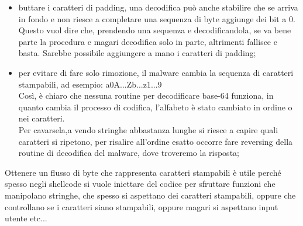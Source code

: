 \documentclass[12pt, oneside]{extbook}
\begin{document}
\begin{itemize}
	\item buttare i caratteri di padding, una decodifica può anche stabilire che se arriva in fondo e non riesce a completare una sequenza di byte aggiunge dei bit a 0. Questo vuol dire che, prendendo una sequenza e decodificandola, se va bene parte la procedura e magari decodifica solo in parte, altrimenti fallisce e basta. Sarebbe possibile aggiungere a mano i caratteri di padding;
	\item per evitare di fare solo rimozione, il malware cambia la sequenza di caratteri stampabili, ad esempio: a0A...Zb...z1...9\;\\Così, è chiaro che nessuna routine per decodificare base-64 funziona, in quanto cambia il processo di codifica, l'alfabeto è stato cambiato in ordine o nei caratteri.\\Per cavarsela,a vendo stringhe abbastanza lunghe si riesce a capire quali caratteri si ripetono, per risalire all'ordine esatto occorre fare reversing della routine di decodifica del malware, dove troveremo la risposta;
\end{itemize}
Ottenere un flusso di byte che rappresenta caratteri stampabili è utile perché spesso negli shellcode si vuole iniettare del codice per sfruttare funzioni che manipolano stringhe, che spesso si aspettano dei caratteri stampabili, oppure che controllano se i caratteri siano stampabili, oppure magari si aspettano input utente etc...
\end{document}
